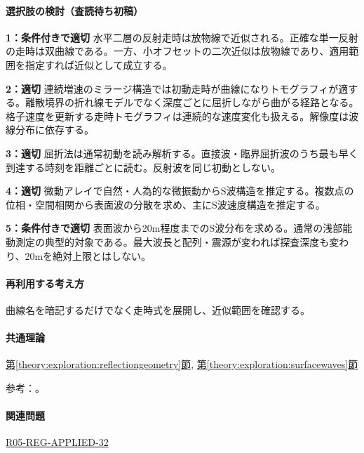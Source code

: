 \paragraph{選択肢の検討（査読待ち初稿）}\mbox{}\par

\noindent\textbf{1：条件付きで適切} 水平二層の反射走時は放物線で近似される。正確な単一反射の走時は双曲線である。一方、小オフセットの二次近似は放物線であり、適用範囲を指定すれば近似として成立する。\par

\noindent\textbf{2：適切} 連続増速のミラージ構造では初動走時が曲線になりトモグラフィが適する。離散境界の折れ線モデルでなく深度ごとに屈折しながら曲がる経路となる。格子速度を更新する走時トモグラフィは連続的な速度変化も扱える。解像度は波線分布に依存する。\par

\noindent\textbf{3：適切} 屈折法は通常初動を読み解析する。直接波・臨界屈折波のうち最も早く到達する時刻を距離ごとに読む。反射波を同じ初動としない。\par

\noindent\textbf{4：適切} 微動アレイで自然・人為的な微振動からS波構造を推定する。複数点の位相・空間相関から表面波の分散を求め、主にS波速度構造を推定する。\par

\noindent\textbf{5：条件付きで適切} 表面波から20m程度までのS波分布を求める。通常の浅部能動測定の典型的対象である。最大波長と配列・震源が変われば探査深度も変わり、20mを絶対上限とはしない。\par

\paragraph{再利用する考え方} 曲線名を暗記するだけでなく走時式を展開し、近似範囲を確認する。

\paragraph{共通理論} \hyperref[theory:exploration:reflectiongeometry]{第\ref*{theory:exploration:reflectiongeometry}節}, \hyperref[theory:exploration:surfacewaves]{第\ref*{theory:exploration:surfacewaves}節}

\par 参考：\cite{epa_seismic_reflection,jica_refraction2015,moe_surface2004,epa_surfacewaves}。

\paragraph{関連問題} \hyperref[q:r05-reg-applied-32]{R05-REG-APPLIED-32}

